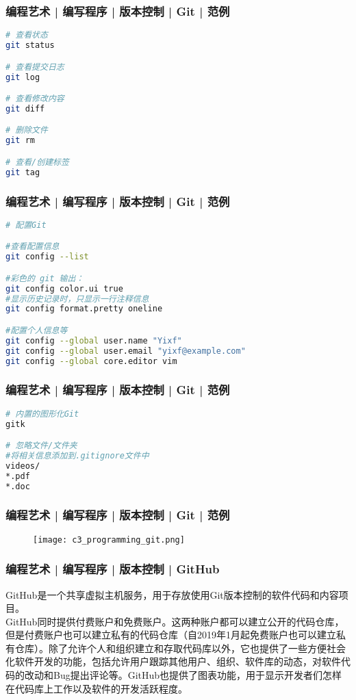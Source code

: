 \begin{frame}[fragile]
  \frametitle{编程艺术 | 编写程序 | 版本控制 | Git | \alert{范例}}
  \vspace{-1.5em}
\begin{lstlisting}[language=sh]
# 查看状态
git status

# 查看提交日志
git log

# 查看修改内容
git diff

# 删除文件
git rm

# 查看/创建标签
git tag
\end{lstlisting}
\end{frame}

\begin{frame}[fragile]
  \frametitle{编程艺术 | 编写程序 | 版本控制 | Git | 范例}
  \vspace{-1.5em}
\begin{lstlisting}[language=sh]
# 配置Git

#查看配置信息
git config --list

#彩色的 git 输出：
git config color.ui true
#显示历史记录时，只显示一行注释信息
git config format.pretty oneline

#配置个人信息等
git config --global user.name "Yixf"
git config --global user.email "yixf@example.com"
git config --global core.editor vim
\end{lstlisting}
\end{frame}

\begin{frame}[fragile]
  \frametitle{编程艺术 | 编写程序 | 版本控制 | Git | 范例}
\begin{lstlisting}[language=sh]
# 内置的图形化Git
gitk

# 忽略文件/文件夹
#将相关信息添加到.gitignore文件中
videos/
*.pdf
*.doc
\end{lstlisting}
\end{frame}

\begin{frame}
  \frametitle{编程艺术 | 编写程序 | 版本控制 | Git | \alert{范例}}
  \begin{figure}
    \centering
    \texttt{[image: c3\_programming\_git.png]}
  \end{figure}
\end{frame}

\begin{frame}
  \frametitle{编程艺术 | 编写程序 | 版本控制 | \alert{GitHub}}
  GitHub是一个共享虚拟主机服务，用于\alert{存放使用Git版本控制的软件代码和内容项目}。\\
  \vspace{1em}
GitHub同时提供付费账户和免费账户。这两种账户都可以建立公开的代码仓库，但是付费账户也可以建立私有的代码仓库（自2019年1月起免费账户也可以建立私有仓库）。除了允许个人和组织建立和存取代码库以外，它也提供了一些方便社会化软件开发的功能，包括允许用户跟踪其他用户、组织、软件库的动态，对软件代码的改动和Bug提出评论等。GitHub也提供了图表功能，用于显示开发者们怎样在代码库上工作以及软件的开发活跃程度。\\
\end{frame}

